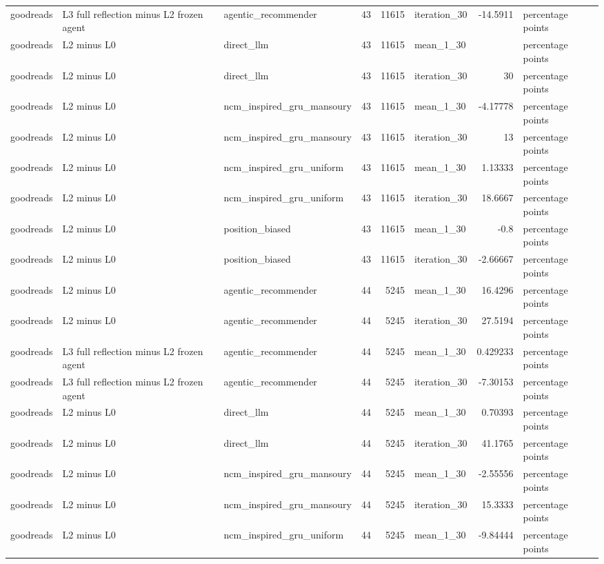 \begin{table}[htbp!]
\begin{tabular}{lllrrlrl}
goodreads & L3 full reflection minus L2 frozen agent & agentic\_recommender & 43 & 11615 & iteration\_30 & -14.5911 & percentage points \\
goodreads & L2 minus L0 & direct\_llm & 43 & 11615 & mean\_1\_30 & \textemdash{} & percentage points \\
goodreads & L2 minus L0 & direct\_llm & 43 & 11615 & iteration\_30 & 30 & percentage points \\
goodreads & L2 minus L0 & ncm\_inspired\_gru\_mansoury & 43 & 11615 & mean\_1\_30 & -4.17778 & percentage points \\
goodreads & L2 minus L0 & ncm\_inspired\_gru\_mansoury & 43 & 11615 & iteration\_30 & 13 & percentage points \\
goodreads & L2 minus L0 & ncm\_inspired\_gru\_uniform & 43 & 11615 & mean\_1\_30 & 1.13333 & percentage points \\
goodreads & L2 minus L0 & ncm\_inspired\_gru\_uniform & 43 & 11615 & iteration\_30 & 18.6667 & percentage points \\
goodreads & L2 minus L0 & position\_biased & 43 & 11615 & mean\_1\_30 & -0.8 & percentage points \\
goodreads & L2 minus L0 & position\_biased & 43 & 11615 & iteration\_30 & -2.66667 & percentage points \\
goodreads & L2 minus L0 & agentic\_recommender & 44 & 5245 & mean\_1\_30 & 16.4296 & percentage points \\
goodreads & L2 minus L0 & agentic\_recommender & 44 & 5245 & iteration\_30 & 27.5194 & percentage points \\
goodreads & L3 full reflection minus L2 frozen agent & agentic\_recommender & 44 & 5245 & mean\_1\_30 & 0.429233 & percentage points \\
goodreads & L3 full reflection minus L2 frozen agent & agentic\_recommender & 44 & 5245 & iteration\_30 & -7.30153 & percentage points \\
goodreads & L2 minus L0 & direct\_llm & 44 & 5245 & mean\_1\_30 & 0.70393 & percentage points \\
goodreads & L2 minus L0 & direct\_llm & 44 & 5245 & iteration\_30 & 41.1765 & percentage points \\
goodreads & L2 minus L0 & ncm\_inspired\_gru\_mansoury & 44 & 5245 & mean\_1\_30 & -2.55556 & percentage points \\
goodreads & L2 minus L0 & ncm\_inspired\_gru\_mansoury & 44 & 5245 & iteration\_30 & 15.3333 & percentage points \\
goodreads & L2 minus L0 & ncm\_inspired\_gru\_uniform & 44 & 5245 & mean\_1\_30 & -9.84444 & percentage points \\

\end{tabular}
\end{table}
